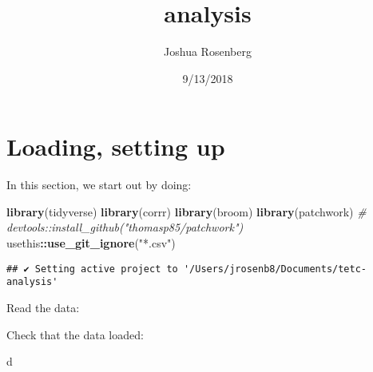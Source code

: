 \documentclass[]{article}
\title{analysis}
\author{Joshua Rosenberg}
\date{9/13/2018}
\newenvironment{Shaded}{\begin{snugshade}}{\end{snugshade}}
\newcommand{\KeywordTok}[1]{\textcolor[rgb]{0.13,0.29,0.53}{\textbf{#1}}}
\newcommand{\DecValTok}[1]{\textcolor[rgb]{0.00,0.00,0.81}{#1}}
\newcommand{\StringTok}[1]{\textcolor[rgb]{0.31,0.60,0.02}{#1}}
\newcommand{\CommentTok}[1]{\textcolor[rgb]{0.56,0.35,0.01}{\textit{#1}}}
\newcommand{\OperatorTok}[1]{\textcolor[rgb]{0.81,0.36,0.00}{\textbf{#1}}}
\newcommand{\NormalTok}[1]{#1}
\begin{document}
\maketitle

{
\setcounter{tocdepth}{2}
\tableofcontents
}
\section{Loading, setting up}\label{loading-setting-up}

In this section, we start out by doing:

\begin{Shaded}
\begin{Highlighting}[]
\KeywordTok{library}\NormalTok{(tidyverse)}
\KeywordTok{library}\NormalTok{(corrr)}
\KeywordTok{library}\NormalTok{(broom)}
\KeywordTok{library}\NormalTok{(patchwork) }\CommentTok{# devtools::install_github("thomasp85/patchwork")}
\NormalTok{usethis}\OperatorTok{::}\KeywordTok{use_git_ignore}\NormalTok{(}\StringTok{"*.csv"}\NormalTok{)}
\end{Highlighting}
\end{Shaded}

\begin{verbatim}
## ✔ Setting active project to '/Users/jrosenb8/Documents/tetc-analysis'
\end{verbatim}

Read the data:

\begin{Shaded}
\end{Shaded}

Check that the data loaded:

\begin{Shaded}
\begin{Highlighting}[]
\NormalTok{d}
\end{Highlighting}
\end{Shaded}
\end{document}
